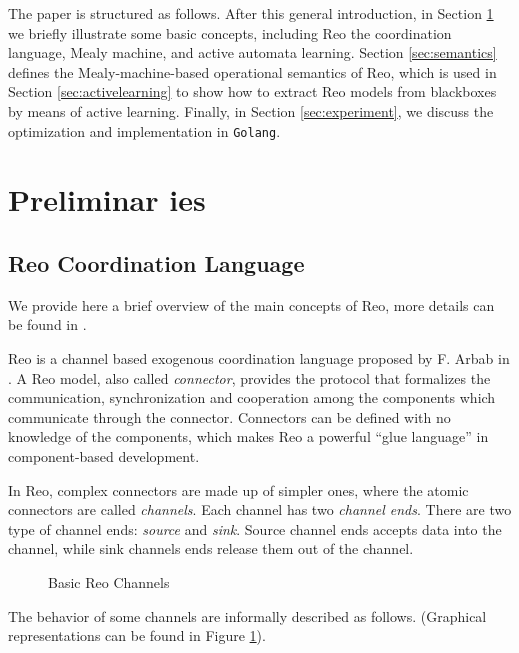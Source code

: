 \documentclass[conference, a4paper]{IEEEtran}
\begin{document}
The paper is structured as follows. After this general introduction, in Section
\ref{sec:preliminaries} we briefly illustrate some basic concepts, including Reo the coordination
language, Mealy machine, and active automata learning. Section \ref{sec:semantics} defines the
Mealy-machine-based operational semantics of Reo, which is used in Section \ref{sec:activelearning}
to show how to extract Reo models from blackboxes by means of active learning. Finally, in Section
\ref{sec:experiment}, we discuss the optimization and implementation in \texttt{Golang}.

\section{Preliminar ies} 
\label{sec:preliminaries}
\subsection{Reo Coordination Language} 
\label{sec:reo}
We provide here a brief overview of the main concepts of Reo, more details can be found in
\cite{DBLP:journals/mscs/Arbab04, DBLP:journals/scp/BaierSAR06}.

Reo is a channel based exogenous coordination language proposed by F. Arbab in
\cite{DBLP:journals/mscs/Arbab04}. 
A Reo model, also called \emph{connector}, provides the protocol
that formalizes the communication, synchronization and cooperation among the components which
communicate through the connector. Connectors can be defined with no knowledge of the components,
which makes Reo a powerful ``glue language'' in component-based
development\cite{DBLP:journals/sigsoft/Gill03}.

In Reo, complex connectors are made up of simpler ones, where the atomic connectors are called
\emph{channels}. Each channel has two \emph{channel ends}. There are two type of channel ends:
\emph{source} and \emph{sink}. Source channel ends accepts data into the channel, while sink
channels ends release them out of the channel. 

\begin{figure}[h]
  \begin{center}
    
  \end{center}
  \caption{Basic Reo Channels}
  \label{fig:basic}
\end{figure}

The behavior of some channels are informally described as follows. (Graphical representations
can be found in Figure \ref{fig:basic}).
\end{document}
